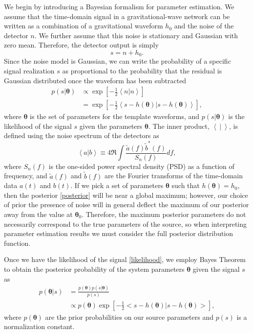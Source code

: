 \documentclass[11pt,a4paper]{emulateapj} 
\newcommand{\thpara}{\boldsymbol{\theta}}
\begin{document}
We begin by introducing a Bayesian formalism for parameter estimation.
We assume that the time-domain signal in a gravitational-wave network
can be written as a combination of a gravitational waveform $h_0$ and
the noise of the detector $n$.  We further assume that this noise is
stationary and Gaussian with zero mean.  Therefore, the detector
output is simply
\begin{equation}
s = n + h_0 .
\label{SignalAddition}
\end{equation}
Since the noise model is Gaussian, we can write the probability of a
specific signal realization $s$ as proportional to the probability
that the residual is Gaussian distributed once the waveform has been
subtracted
\begin{align}
  p(s | \thpara) &\propto \exp\left[-\frac{1}{2}\left<n|n
    \right>\right] \nonumber \\ &= \exp\left[-\frac{1}{2}\left < s -
    h(\thpara) | s-h(\thpara)\right >\right] ,
  \label{likelihood}
\end{align}
where $\thpara$ is the set of parameters for the template waveforms,
and $p(s | \thpara)$ is the likelihood of the signal $s$ given the
parameters $\thpara$.  The inner product, $\left< ~|~ \right> $, is
defined using the noise spectrum of the detectors as
\begin{equation}
  \left<a|b\right> \equiv 4 \Re \int
  \frac{\tilde{a}(f)\tilde{b}^*(f)}{S_n(f)} df ,
  \label{innerProduct}
\end{equation}
where $S_n(f)$ is the one-sided power spectral density (PSD) as a
function of frequency, and $\tilde{a}(f)$ and $\tilde{b}(f)$ are the
Fourier transforms of the time-domain data $a(t)$ and $b(t)$.  If we
pick a set of parameters $\thpara$ such that $h(\thpara) = h_0$, then
the posterior \eqref{posterior} will be near a global maximum;
however, our choice of prior the presence of noise will in general
deflect the maximum of our posterior away from the value at
$\thpara_0$.  Therefore, the maximum posterior parameters do not
necessarily correspond to the true parameters of the source, so when
interpreting parameter estimation results we must consider the full
posterior distribution function.
 
Once we have the likelihood of the signal \eqref{likelihood}, we
employ Bayes Theorem to obtain the posterior probability of the system
parameters $\thpara$ given the signal $s$ as
\begin{align}
  p(\thpara | s) &= \frac{p(\thpara)p(s | \thpara)}{p(s)}
  \nonumber\\ & \propto p(\thpara) \exp\left[-\frac{1}{2}\big < s -
    h(\thpara) | s-h(\thpara) \big > \right] ,
  \label{posterior}
\end{align}
where $p(\thpara)$ are the prior probabilities on our source
parameters and $p(s)$ is a normalization constant.
\end{document}
